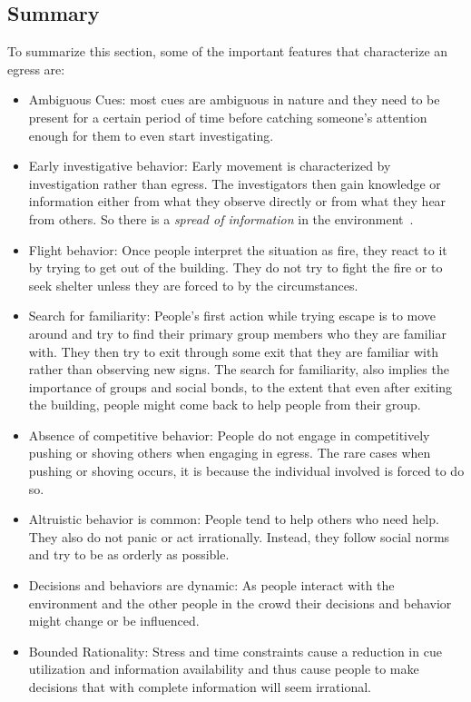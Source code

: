 \subsection{Summary}
\label{LiteratureReview:PsychSummary}

To summarize this section, some of the important features that characterize an egress are:
\begin{itemize}
\item Ambiguous Cues: most cues are ambiguous in nature and they need to be present for a certain period of time before catching someone's attention enough for them to even start investigating.
\item Early investigative behavior: Early movement is characterized by investigation rather than egress. The investigators then gain knowledge or information either from what they observe directly or from what they hear from others. So there is a \emph{spread of information} in the environment~\cite{Fahy:2010to,Purser:2001ts}.
\item Flight behavior: Once people interpret the situation as fire, they react to it by trying to get out of the building. They do not try to fight the fire or to seek shelter unless they are forced to by the circumstances.
\item Search for familiarity: People's first action while trying escape is to move around and try to find their primary group members who they are familiar with. They then try to exit through some exit that they are familiar with rather than observing new signs. The search for familiarity, also implies the importance of groups and social bonds, to the extent that even after exiting the building, people might come back to help people from their group.
\item Absence of competitive behavior: People do not engage in competitively pushing or shoving others when engaging in egress. The rare cases when pushing or shoving occurs, it is because the individual involved is forced to do so.
\item Altruistic behavior is common: People tend to help others who need help. They also do not panic or act irrationally. Instead, they follow social norms and try to be as orderly as possible.
\item Decisions and behaviors are dynamic: As people interact with the environment and the other people in the crowd their decisions and behavior might change or be influenced.
\item Bounded Rationality: Stress and time constraints cause a reduction in cue utilization and information availability and thus cause people to make decisions that with complete information will seem irrational.
\end{itemize}

